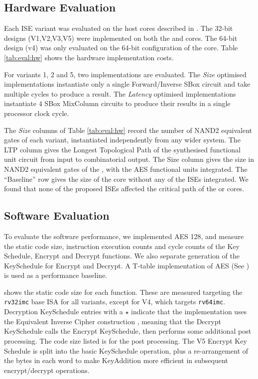
\subsection{Hardware Evaluation}
\label{sec:eval:hw}

Each ISE variant was evaluated on the host cores
described in .
The 32-bit designs (V1,V2,V3,V5) were implemented on both the
 and  cores.
The 64-bit design (v4) was only evaluated on the 64-bit configuration
of the  core.
Table \ref{tab:eval:hw} shows the hardware implementation costs.

For variants 1, 2 and 5, two implementations are evaluated.
The {\em Size} optimised implementations instantiate only a single
Forward/Inverse SBox circuit and take multiple cycles
to produce a result.
The {\em Latency} optimised implementations instantiate $4$ SBox
MixColumn circuits to produce their results in a single processor 
clock cycle.

The {\em Size} columns of Table \ref{tab:eval:hw} 
record the number of NAND2 equivalent gates of each variant,
instantiated independently from any wider system.
The LTP column gives the Longest Topological Path of the synthesised
functional unit circuit from input to combinatorial output.
The  Size column gives the size in NAND2 equivalent gates of the
, with the AES functional units integrated.
The ``Baseline'' row gives the size of the core without any of the
ISEs integrated.
We found that none of the proposed ISEs affected the critical
path of the  or  cores.



\subsection{Software Evaluation}
\label{sec:eval:sw}

To evaluate the software performance, we implemented AES 128, and
measure the static code size, instruction execution counts and cycle
counts of the Key Schedule, Encrypt and Decrypt functions.
We also separate generation of the KeySchedule for Encrypt and Decrypt.
A T-table implementation of AES (See )
is used as a performance baseline.

 shows the static code size for each
function.
These are measured targeting the {\tt rv32imc} base ISA for all variants,
except for V4, which targets {\tt rv64imc}.
Decryption KeySchedule entries with a $\star$ indicate that the
implementation uses the Equivalent Inverse Cipher construction
\cite[Section 5.3.5, Page 23]{FIPS:197}, meaning that the
Decrypt KeySchedule calls the Encrypt KeySchedule, then performs some
additional post processing. The code size listed is for the post processing.
The V5 Encrypt Key Schedule is split into the basic KeySchedule
operation, plus a re-arrangement of the bytes in each word to make
KeyAddition more efficient in subsequent encrypt/decrypt operations.

